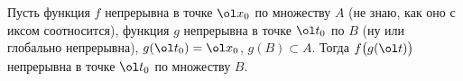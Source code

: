 
	 Пусть функция $f$ непрерывна в точке $\ol x_0$ по множеству $A$ (не знаю, как оно с иксом соотносится), функция $g$ непрерывна в точке $\ol t_0$
	 по $B$ (ну или глобально непрерывна), $g(\ol t_0) = \ol x_0$, $g(B)\subset A$. 
	 Тогда $f\big(g(\ol t)\big)$ непрерывна в точке $\ol t_0$ по множеству $B$.
	 